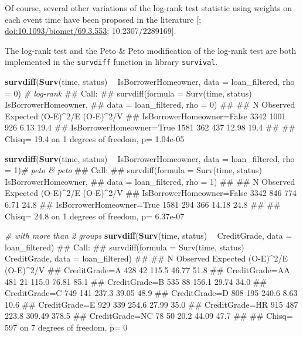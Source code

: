 \documentclass[]{book}
\makeatletter
\newenvironment{Shaded}{\begin{snugshade}}{\end{snugshade}}
\newcommand{\KeywordTok}[1]{\textcolor[rgb]{0.13,0.29,0.53}{\textbf{#1}}}
\newcommand{\DataTypeTok}[1]{\textcolor[rgb]{0.13,0.29,0.53}{#1}}
\newcommand{\DecValTok}[1]{\textcolor[rgb]{0.00,0.00,0.81}{#1}}
\newcommand{\StringTok}[1]{\textcolor[rgb]{0.31,0.60,0.02}{#1}}
\newcommand{\CommentTok}[1]{\textcolor[rgb]{0.56,0.35,0.01}{\textit{#1}}}
\newcommand{\OperatorTok}[1]{\textcolor[rgb]{0.81,0.36,0.00}{\textbf{#1}}}
\newcommand{\NormalTok}[1]{#1}
\newenvironment{kframe}{%
\medskip{}
\setlength{\fboxsep}{.8em}
 \def\at@end@of@kframe{}%
 \ifinner\ifhmode%
  \def\at@end@of@kframe{\end{minipage}}%
  \begin{minipage}{\columnwidth}%
 \fi\fi%
 \def\FrameCommand##1{\hskip\@totalleftmargin \hskip-\fboxsep
 \colorbox{shadecolor}{##1}\hskip-\fboxsep
     \hskip-\linewidth \hskip-\@totalleftmargin \hskip\columnwidth}%
 \MakeFramed {\advance\hsize-\width
   \@totalleftmargin\z@ \linewidth\hsize
   \@setminipage}}%
 {\par\unskip\endMakeFramed%
 \at@end@of@kframe}
\renewenvironment{Shaded}{\begin{kframe}}{\end{kframe}}
\theoremstyle{definition}
\theoremstyle{definition}
\theoremstyle{definition}
\theoremstyle{remark}
\makeatother
\begin{document}
Of course, several other variations of the log-rank test statistic using
weights on each event time have been proposed in the literature
{[}\citet{CIS-23788}; \url{doi:10.1093/biomet/69.3.553};
10.2307/2289169{]}.

The log-rank test and the Peto \& Peto modification of the log-rank test
are both implemented in the \texttt{survdiff} function in library
\texttt{survival}.

\begin{Shaded}
\begin{Highlighting}[]
\KeywordTok{survdiff}\NormalTok{(}\KeywordTok{Surv}\NormalTok{(time, status) }\OperatorTok{~}\StringTok{ }\NormalTok{IsBorrowerHomeowner, }\DataTypeTok{data =}\NormalTok{ loan_filtered, }\DataTypeTok{rho =} \DecValTok{0}\NormalTok{) }\CommentTok{# log-rank}
\NormalTok{## Call:}
\NormalTok{## survdiff(formula = Surv(time, status) ~ IsBorrowerHomeowner, }
\NormalTok{##     data = loan_filtered, rho = 0)}
\NormalTok{## }
\NormalTok{##                              N Observed Expected (O-E)^2/E (O-E)^2/V}
\NormalTok{## IsBorrowerHomeowner=False 3342     1001      926      6.13      19.4}
\NormalTok{## IsBorrowerHomeowner=True  1581      362      437     12.98      19.4}
\NormalTok{## }
\NormalTok{##  Chisq= 19.4  on 1 degrees of freedom, p= 1.04e-05}

\KeywordTok{survdiff}\NormalTok{(}\KeywordTok{Surv}\NormalTok{(time, status) }\OperatorTok{~}\StringTok{ }\NormalTok{IsBorrowerHomeowner, }\DataTypeTok{data =}\NormalTok{ loan_filtered, }\DataTypeTok{rho =} \DecValTok{1}\NormalTok{)}\CommentTok{# peto & peto}
\NormalTok{## Call:}
\NormalTok{## survdiff(formula = Surv(time, status) ~ IsBorrowerHomeowner, }
\NormalTok{##     data = loan_filtered, rho = 1)}
\NormalTok{## }
\NormalTok{##                              N Observed Expected (O-E)^2/E (O-E)^2/V}
\NormalTok{## IsBorrowerHomeowner=False 3342      846      774      6.71      24.8}
\NormalTok{## IsBorrowerHomeowner=True  1581      294      366     14.18      24.8}
\NormalTok{## }
\NormalTok{##  Chisq= 24.8  on 1 degrees of freedom, p= 6.37e-07}

\CommentTok{# with more than 2 groups}
\KeywordTok{survdiff}\NormalTok{(}\KeywordTok{Surv}\NormalTok{(time, status) }\OperatorTok{~}\StringTok{ }\NormalTok{CreditGrade, }\DataTypeTok{data =}\NormalTok{ loan_filtered)}
\NormalTok{## Call:}
\NormalTok{## survdiff(formula = Surv(time, status) ~ CreditGrade, data = loan_filtered)}
\NormalTok{## }
\NormalTok{##                  N Observed Expected (O-E)^2/E (O-E)^2/V}
\NormalTok{## CreditGrade=A  428       42    115.5     46.77      51.8}
\NormalTok{## CreditGrade=AA 481       21    115.0     76.81      85.1}
\NormalTok{## CreditGrade=B  535       88    156.1     29.74      34.0}
\NormalTok{## CreditGrade=C  749      141    237.3     39.05      48.9}
\NormalTok{## CreditGrade=D  808      195    240.6      8.63      10.6}
\NormalTok{## CreditGrade=E  929      339    254.6     27.99      35.0}
\NormalTok{## CreditGrade=HR 915      487    223.8    309.49     378.5}
\NormalTok{## CreditGrade=NC  78       50     20.2     44.09      47.7}
\NormalTok{## }
\NormalTok{##  Chisq= 597  on 7 degrees of freedom, p= 0}
\end{Highlighting}
\end{Shaded}
\end{document}
